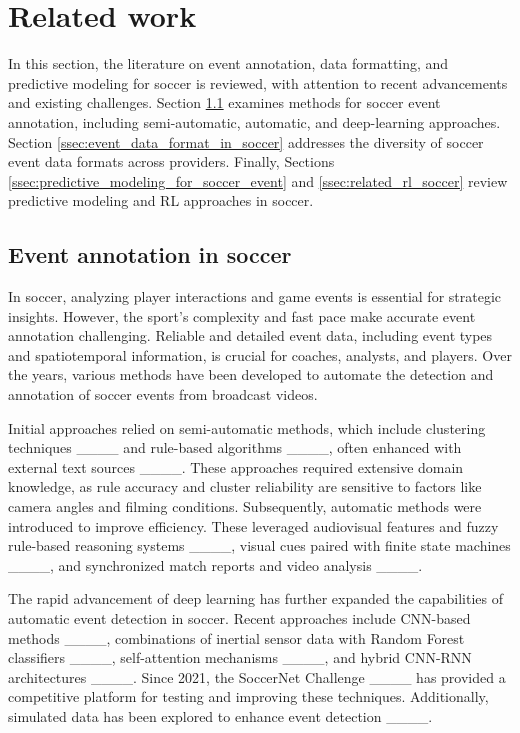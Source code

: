 \section{Related work}
\label{sec:related_work}
In this section, the literature on event annotation, data formatting, and predictive modeling for soccer is reviewed, with attention to recent advancements and existing challenges. Section \ref{ssec:event_annotation_in_soccer} examines methods for soccer event annotation, including semi-automatic, automatic, and deep-learning approaches. Section \ref{ssec:event_data_format_in_soccer} addresses the diversity of soccer event data formats across providers. Finally, Sections \ref{ssec:predictive_modeling_for_soccer_event} and \ref{ssec:related_rl_soccer} review predictive modeling and RL approaches in soccer.



\subsection{Event annotation in soccer}
\label{ssec:event_annotation_in_soccer}

In soccer, analyzing player interactions and game events is essential for strategic insights. However, the sport’s complexity and fast pace make accurate event annotation challenging. Reliable and detailed event data, including event types and spatiotemporal information, is crucial for coaches, analysts, and players. Over the years, various methods have been developed to automate the detection and annotation of soccer events from broadcast videos.

Initial approaches relied on semi-automatic methods, which include clustering techniques ____ and rule-based algorithms ____, often enhanced with external text sources ____. These approaches required extensive domain knowledge, as rule accuracy and cluster reliability are sensitive to factors like camera angles and filming conditions. Subsequently, automatic methods were introduced to improve efficiency. These leveraged audiovisual features and fuzzy rule-based reasoning systems ____, visual cues paired with finite state machines ____, and synchronized match reports and video analysis ____.

The rapid advancement of deep learning has further expanded the capabilities of automatic event detection in soccer. Recent approaches include CNN-based methods ____, combinations of inertial sensor data with Random Forest classifiers ____, self-attention mechanisms ____, and hybrid CNN-RNN architectures ____. Since 2021, the SoccerNet Challenge ____ has provided a competitive platform for testing and improving these techniques. Additionally, simulated data has been explored to enhance event detection ____.

